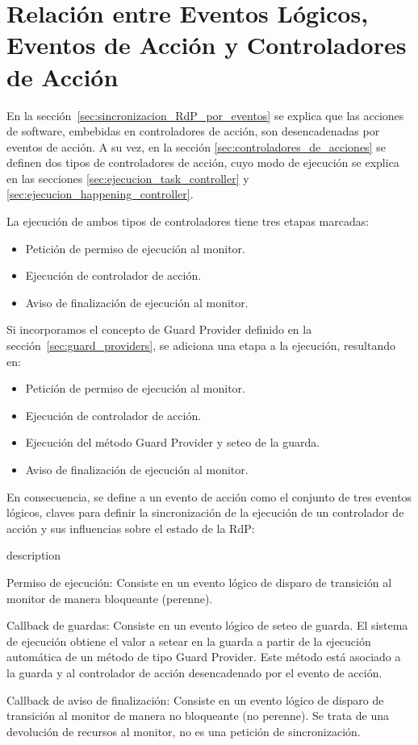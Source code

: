 \section{Relación entre Eventos Lógicos, Eventos de Acción y Controladores de
Acción}
\label{sec:relacion_evento_controlador}
En la sección~\ref{sec:sincronizacion_RdP_por_eventos} se explica que las
acciones de software, embebidas en controladores de acción, son desencadenadas
por eventos de acción. A su vez, en la sección
\ref{sec:controladores_de_acciones} se definen dos tipos de controladores de
acción, cuyo modo de ejecución se explica en las secciones
\ref{sec:ejecucion_task_controller} y \ref{sec:ejecucion_happening_controller}.

La ejecución de ambos tipos de controladores tiene tres etapas marcadas:
\begin{itemize}
  \item Petición de permiso de ejecución al monitor.
  \item Ejecución de controlador de acción.
  \item Aviso de finalización de ejecución al monitor.
\end{itemize}

Si incorporamos el concepto de Guard Provider definido en la
sección~\ref{sec:guard_providers}, se adiciona una etapa a la ejecución,
resultando en:
\begin{itemize}
  \item Petición de permiso de ejecución al monitor.
  \item Ejecución de controlador de acción.
  \item Ejecución del método Guard Provider y seteo de la guarda.
  \item Aviso de finalización de ejecución al monitor.
\end{itemize}

En consecuencia, se define a un evento de acción como el conjunto de tres
eventos lógicos, claves para definir la sincronización de la ejecución de un
controlador de acción y sus influencias sobre el estado de la RdP:
\begin{labeling}{description}
  \item [Permiso de ejecución: ] Consiste en un evento lógico de disparo
  de transición al monitor de manera bloqueante (perenne).
  \item [Callback de guardas: ] Consiste en un evento lógico de seteo de
  guarda. El sistema de ejecución obtiene el valor a setear en la guarda a
  partir de la ejecución automática de un método de tipo Guard Provider. Este
  método está asociado a la guarda y al controlador de acción desencadenado por
  el evento de acción.
  \item [Callback de aviso de finalización: ]
  Consiste en un evento lógico de disparo de transición al monitor de manera no
  bloqueante (no perenne). Se trata de una devolución de recursos al monitor,
  no es una petición de sincronización.
\end{labeling}

